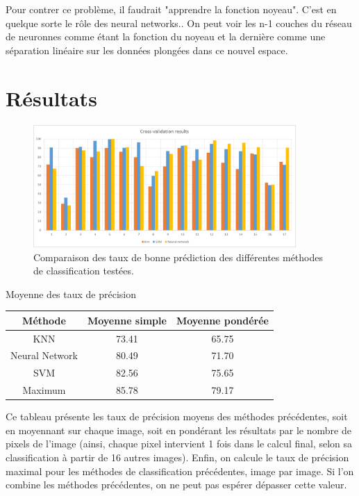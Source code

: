 \documentclass[a4paper,10pt]{report}
\begin{document}
Pour contrer ce problème, il faudrait "apprendre la fonction noyeau". C'est en quelque sorte le rôle des neural networks.. On peut voir les n-1 couches du réseau de neuronnes comme étant la fonction du noyeau et la dernière comme une séparation linéaire sur les données plongées dans ce nouvel espace.

\section*{Résultats}

\begin{figure}[htbp]
  \caption{Comparaison des taux de bonne prédiction des différentes méthodes de classification testées.}
  \centering
  \includegraphics[width=10cm]{Compared_CV.png}
\end{figure}

\begin{center}
Moyenne des taux de précision\\

\begin{tabular}{|c|c|c|}  
  \hline
  Méthode & Moyenne simple & Moyenne pondérée\\
  \hline
  KNN & 73.41 & 65.75\\
  Neural Network & 80.49 & 71.70\\  
  SVM & 82.56 & 75.65\\
  \hline
  Maximum & 85.78 & 79.17\\
  \hline
\end{tabular}
\end{center}

Ce tableau présente les taux de précision moyens des méthodes précédentes, soit en moyennant sur chaque image, soit en pondérant les résultats par le nombre de pixels de l'image (ainsi, chaque pixel intervient 1 fois dans le calcul final, selon sa classification à partir de 16 autres images).
Enfin, on calcule le taux de précision maximal pour les méthodes de classification précédentes, image par image. Si l'on combine les méthodes précédentes, on ne peut pas espérer dépasser cette valeur.
\end{document}
